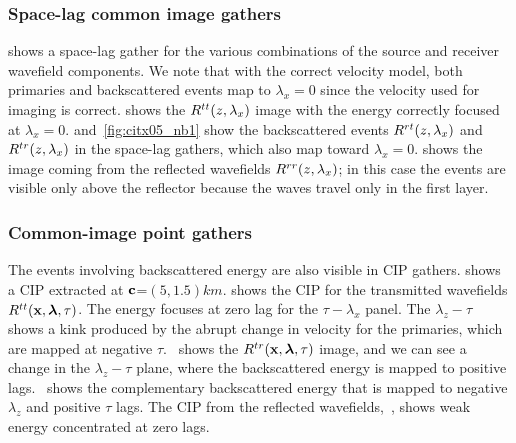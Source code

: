 \subsubsection{Space-lag common image gathers}


 shows a space-lag gather for the various combinations of the source and receiver wavefield components. 
We note that with the correct velocity model, both primaries and backscattered events map to $\lambda_x=0$ since the velocity used for 
imaging is correct. 
%
 shows the $R^{tt}(z,\lambda_x)$ image with the energy correctly focused at $\lambda_x=0$. 
 and~\ref{fig:citx05_nb1} show the backscattered events $R^{rt}(z,\lambda_x)$ and $R^{tr}(z,\lambda_x)$ in the space-lag gathers, 
which also map toward $\lambda_x=0$.
%
 shows the image coming from the reflected wavefields $R^{rr}(z,\lambda_x)$; in this case the events are
visible only above the reflector because the waves travel only in the first layer.

\subsubsection{Common-image point gathers}

The events involving backscattered energy are also visible in CIP gathers.
%
 shows a CIP extracted at ${\bf c}$=$(5,1.5)km$.
 shows the CIP for the transmitted wavefields $R^{tt}({\bf x},{\boldsymbol{\lambda}},\tau)$. The energy focuses at zero lag 
for the $\tau-\lambda_x$ panel. The $\lambda_z-\tau$ shows a kink produced by the abrupt change in velocity for the primaries, which
are mapped at negative $\tau$.~ shows the $R^{tr}({\bf x},{\boldsymbol{\lambda}},\tau)$ image, and we can see a change in the $\lambda_z-\tau$ plane, 
where the backscattered energy is mapped to positive lags.~ shows the complementary backscattered energy
 that is mapped to negative $\lambda_z$ and positive $\tau$ lags.
The CIP from the reflected wavefields,~, shows weak energy concentrated at zero lags.


